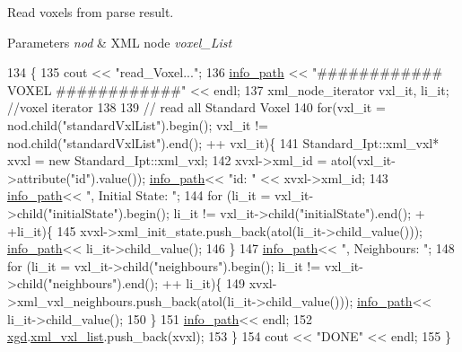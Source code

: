 Read voxels from parse result. 


\begin{DoxyParams}{Parameters}
{\em nod} & X\+M\+L node {\itshape voxel\+\_\+\+List} \\
\hline
\end{DoxyParams}

\begin{DoxyCode}
134                                                 \{
135     cout << \textcolor{stringliteral}{"read\_Voxel..."};
136     \hyperlink{classnw_1_1_standard___ipt_a7b8147e8b90f4adabb30e1b3fd8c40b8}{info\_path} << \textcolor{stringliteral}{"############ VOXEL ############"} << endl;
137     xml\_node\_iterator vxl\_it, li\_it; \textcolor{comment}{//voxel iterator}
138 
139 \textcolor{comment}{//  read all Standard Voxel}
140     \textcolor{keywordflow}{for}(vxl\_it = nod.child(\textcolor{stringliteral}{"standardVxlList"}).begin(); vxl\_it != nod.child(\textcolor{stringliteral}{"standardVxlList"}).end(); ++
      vxl\_it)\{
141         Standard\_Ipt::xml\_vxl* xvxl = \textcolor{keyword}{new} Standard\_Ipt::xml\_vxl;
142         xvxl->xml\_id = atol(vxl\_it->attribute(\textcolor{stringliteral}{"id"}).value()); \hyperlink{classnw_1_1_standard___ipt_a7b8147e8b90f4adabb30e1b3fd8c40b8}{info\_path}<< \textcolor{stringliteral}{"id: "} << xvxl->xml\_id;
143         \hyperlink{classnw_1_1_standard___ipt_a7b8147e8b90f4adabb30e1b3fd8c40b8}{info\_path}<< \textcolor{stringliteral}{", Initial State: "};
144         \textcolor{keywordflow}{for} (li\_it = vxl\_it->child(\textcolor{stringliteral}{"initialState"}).begin(); li\_it != vxl\_it->child(\textcolor{stringliteral}{"initialState"}).end(); +
      +li\_it)\{
145             xvxl->xml\_init\_state.push\_back(atol(li\_it->child\_value())); 
      \hyperlink{classnw_1_1_standard___ipt_a7b8147e8b90f4adabb30e1b3fd8c40b8}{info\_path}<< li\_it->child\_value();
146         \}
147         \hyperlink{classnw_1_1_standard___ipt_a7b8147e8b90f4adabb30e1b3fd8c40b8}{info\_path}<< \textcolor{stringliteral}{", Neighbours: "};
148         \textcolor{keywordflow}{for} (li\_it = vxl\_it->child(\textcolor{stringliteral}{"neighbours"}).begin(); li\_it != vxl\_it->child(\textcolor{stringliteral}{"neighbours"}).end(); ++
      li\_it)\{
149             xvxl->xml\_vxl\_neighbours.push\_back(atol(li\_it->child\_value())); 
      \hyperlink{classnw_1_1_standard___ipt_a7b8147e8b90f4adabb30e1b3fd8c40b8}{info\_path}<< li\_it->child\_value();
150         \}
151         \hyperlink{classnw_1_1_standard___ipt_a7b8147e8b90f4adabb30e1b3fd8c40b8}{info\_path}<< endl;
152         \hyperlink{classnw_1_1_standard___ipt_aad5708d9729b7a5f660dade1927b4d4e}{xgd}.\hyperlink{structnw_1_1_standard___ipt_1_1xml__gen__data_af091596661fc87ef8c7f28317555c6af}{xml\_vxl\_list}.push\_back(xvxl);
153     \}
154     cout << \textcolor{stringliteral}{"DONE"} << endl;
155 \}
\end{DoxyCode}


